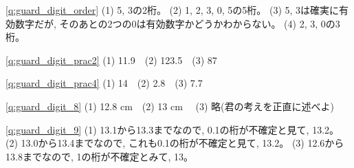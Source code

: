 \ref{q:guard_digit_order} 
(1) 5, 3の2桁。 (2) 1, 2, 3, 0, 5の5桁。 (3) 5, 3は確実に有効数字だが, 
そのあとの2つの0は有効数字かどうかわからない。 (4) 2, 3, 0の3桁。\mv

\ref{q:guard_digit_prac2} (1) 11.9　(2) 123.5　(3) 87\mv

\ref{q:guard_digit_prac4} (1) 14　(2) 2.8　(3) 7.7\mv

\ref{q:guard_digit_8} (1) 12.8 cm　(2) 13 cm　
(3) 略(君の考えを正直に述べよ)\mv

\ref{q:guard_digit_9} 
(1) 13.1から13.3までなので, 0.1の桁が不確定と見て, 13.2。 (2) 13.0から13.4までなので, 
これも0.1の桁が不確定と見て, 13.2。 (3) 12.6から13.8までなので, 1の桁が不確定とみて, 
13。







